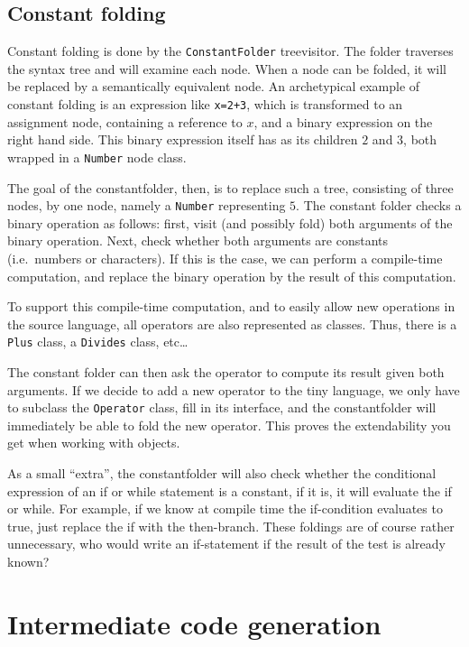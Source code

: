 \documentclass[a4paper]{article}
\begin{document}
\subsection{Constant folding}

Constant folding is done by the \texttt{ConstantFolder} treevisitor.  
The folder traverses the syntax tree and will examine each node. When a node
can be folded, it will be replaced by a semantically equivalent node. An
archetypical example of constant folding is an expression like \texttt{x=2+3},
which is transformed to an assignment node, containing a reference to $x$, and
a binary expression on the right hand side. This binary expression itself has
as its children $2$ and $3$, both wrapped in a \texttt{Number} node class.

The goal of the constantfolder, then, is to replace such a tree, consisting of
three nodes, by one node, namely a \texttt{Number} representing $5$. The
constant folder checks a binary operation as follows: first, visit (and
possibly fold) both arguments of the binary operation. Next, check whether
both arguments are constants (i.e.~numbers or characters). If this is the
case, we can perform a compile-time computation, and replace the binary
operation by the result of this computation.

To support this compile-time computation, and to easily allow new operations
in the source language, all operators are also represented as classes. Thus,
there is a \texttt{Plus} class, a \texttt{Divides} class, etc\ldots{}

The constant folder can then ask the operator to compute its result given both
arguments. If we decide to add a new operator to the tiny language, we only
have to subclass the \texttt{Operator} class, fill in its interface, and the
constantfolder will immediately be able to fold the new operator. This proves
the extendability you get when working with objects.

As a small ``extra'', the constantfolder will also check whether the
conditional expression of an if or while statement is a constant, if it is, it
will evaluate the if or while. For example, if we know at compile time
the if-condition evaluates to true, just replace the if with the then-branch.
These foldings are of course rather unnecessary, who would write an
if-statement if the result of the test is already known?

\section{Intermediate code generation}
\end{document}
